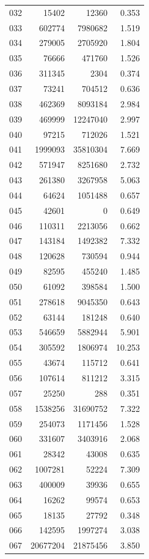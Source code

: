 \documentclass[anonymous,notoc]{gmcm2026}
\begin{document}
\begin{longtable}{lrrr}
032 & 15402 & 12360 & 0.353 \\
033 & 602774 & 7980682 & 1.519 \\
034 & 279005 & 2705920 & 1.804 \\
035 & 76666 & 471760 & 1.526 \\
036 & 311345 & 2304 & 0.374 \\
037 & 73241 & 704512 & 0.636 \\
038 & 462369 & 8093184 & 2.984 \\
039 & 469999 & 12247040 & 2.997 \\
040 & 97215 & 712026 & 1.521 \\
041 & 1999093 & 35810304 & 7.669 \\
042 & 571947 & 8251680 & 2.732 \\
043 & 261380 & 3267958 & 5.063 \\
044 & 64624 & 1051488 & 0.657 \\
045 & 42601 & 0 & 0.649 \\
046 & 110311 & 2213056 & 0.662 \\
047 & 143184 & 1492382 & 7.332 \\
048 & 120628 & 730594 & 0.944 \\
049 & 82595 & 455240 & 1.485 \\
050 & 61092 & 398584 & 1.500 \\
051 & 278618 & 9045350 & 0.643 \\
052 & 63144 & 181248 & 0.640 \\
053 & 546659 & 5882944 & 5.901 \\
054 & 305592 & 1806974 & 10.253 \\
055 & 43674 & 115712 & 0.641 \\
056 & 107614 & 811212 & 3.315 \\
057 & 25250 & 288 & 0.351 \\
058 & 1538256 & 31690752 & 7.322 \\
059 & 254073 & 1171456 & 1.528 \\
060 & 331607 & 3403916 & 2.068 \\
061 & 28342 & 43008 & 0.635 \\
062 & 1007281 & 52224 & 7.309 \\
063 & 400009 & 39936 & 0.655 \\
064 & 16262 & 99574 & 0.653 \\
065 & 18135 & 27792 & 0.348 \\
066 & 142595 & 1997274 & 3.038 \\
067 & 20677204 & 21875456 & 3.850 \\

\end{longtable}
\end{document}
